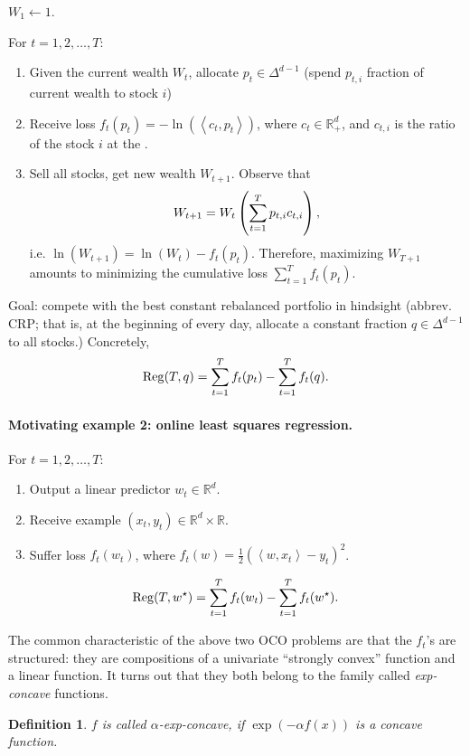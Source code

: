 \documentclass{article}
\newtheorem{definition}{Definition}
\DeclareMathOperator*{\Reg}{{\rm Reg}}
\newcommand{\RR}{\mathbb{R}} %
\newcommand{\inner}[2]{\left\langle #1,#2 \right\rangle}
\begin{document}
$W_1 \gets 1$.

For $t = 1,2,\ldots,T$:
\begin{enumerate}
\item Given the current wealth $W_t$, allocate $p_t \in \Delta^{d-1}$ (spend $p_{t,i}$ fraction of current wealth to stock $i$)
\item Receive loss $f_t(p_t) = -\ln(\inner{c_t}{p_t})$, where $c_t \in \RR^d_+$, and $c_{t,i}$ is the ratio of the stock $i$ at the .
\item Sell all stocks, get new wealth $W_{t+1}$. Observe that
\[ W_{t+1} = W_t \del{\sum_{t=1}^T p_{t,i} c_{t,i}}, \]
i.e. $\ln(W_{t+1}) = \ln(W_t) - f_t(p_t)$. Therefore, maximizing $W_{T+1}$ amounts to minimizing the cumulative loss $\sum_{t=1}^T f_t(p_t)$.
\end{enumerate}

Goal: compete with the best constant rebalanced portfolio in hindsight (abbrev. CRP; that is, at the beginning of every day, allocate a constant fraction $q \in \Delta^{d-1}$ to all stocks.) Concretely,
\[ \Reg(T, q) = \sum_{t=1}^T f_t(p_t) - \sum_{t=1}^T f_t(q). \]


\paragraph{Motivating example 2: online least squares regression.}

For $t = 1,2,\ldots,T$:
\begin{enumerate}
\item Output a linear predictor $w_t \in \RR^d$.
\item Receive example $(x_t, y_t) \in \RR^d \times \RR$.
\item Suffer loss $f_t(w_t)$, where $f_t(w) = \frac12(\inner{w}{x_t} - y_t)^2$.
\end{enumerate}

\[ \Reg(T, w^\star) = \sum_{t=1}^T f_t(w_t) - \sum_{t=1}^T f_t(w^\star). \]

The common characteristic of the above two OCO problems are that the $f_t$'s are structured:
they are compositions of a univariate ``strongly convex'' function and a linear function. It turns out that they both belong to the family called {\em exp-concave} functions.

\begin{definition}
$f$ is called $\alpha$-exp-concave, if $\exp(-\alpha f(x))$ is a concave function.
\end{definition}
\end{document}
